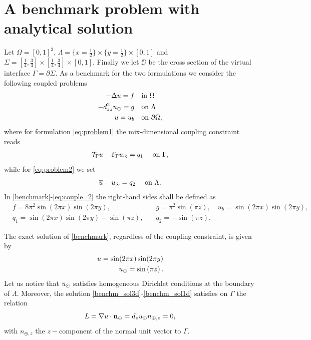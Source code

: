 \section{A benchmark problem with analytical solution}


Let $\Omega=[0,1]^3$, $\Lambda=\{x=\tfrac{1}{2}\}\times \{y=\tfrac{1}{2}\} \times [0,1] $
and $\Sigma=[\tfrac{1}{4}, \tfrac{3}{4}]\times [\tfrac{1}{4}, \tfrac{3}{4}]\times [0, 1]$.
Finally we let $\DD$ be the cross section of the virtual interface $\Gamma=\partial \Sigma$.
As a benchmark for the two formulations we consider the following coupled problems
%
\begin{subequations}\label{benchmark}
\begin{align}
\label{benchm_3d}
-\Delta u=f \quad &\text{in $\Omega$}\\
\label{benchm_1d}
-d_{zz}^2 \ud =g \quad &\text{on $\Lambda$}\\
u=u_b \quad &\text{on $\partial \Omega$},
\end{align}
\end{subequations}
where for formulation \eqref{eq:problem1} the mix-dimensional coupling constraint reads
\begin{equation}
  \label{eq:couple_1}
\trace{u} - \ext{\ud} = q_1\quad\text{ on }\Gamma,
\end{equation}
while for \eqref{eq:problem2} we set
\begin{equation}
    \label{eq:couple_2}
\avrc{u} - \ud = q_2\quad\text{ on }\Lambda.
\end{equation}
%
In \eqref{benchmark}-\eqref{eq:couple_2} the right-hand sides shall be defined as 
\begin{eqnarray*}
  &f=8\pi ^2 \sin (2\pi x) \sin (2\pi y),\quad &g={\pi ^2}\sin \left({\pi z}\right),\quad u_b=\sin (2\pi x) \sin (2\pi y),\\
  &q_1=\sin (2\pi x) \sin (2\pi y) - \sin \left({\pi z}\right),\quad &q_2=-\sin \left({\pi z}\right).
\end{eqnarray*}

The exact solution of \eqref{benchmark}, regardless of the coupling constraint,
is given by
%
\begin{eqnarray}
\label{benchm_sol3d}
u=\sin (2\pi x) \sin (2\pi y)\\
\label{benchm_sol1d}
\ud=\sin \left({\pi z}\right).
\end{eqnarray}
%
Let us notice that $u_{\odot}$ satisfies homogeneous Dirichlet conditions at the boundary of $\Lambda$.
Moreover, the solution \eqref{benchm_sol3d}-\eqref{benchm_sol1d} satisfies on $\Gamma$ the relation
\begin{equation}\label{benchm_flux}
L=\nabla u \cdot \textbf{n}_{\oplus}=d_z \ud n_{\oplus,z}=0,
\end{equation}
with $n_{\oplus,z}$ the $z-$component of the normal unit vector to $\Gamma$.

